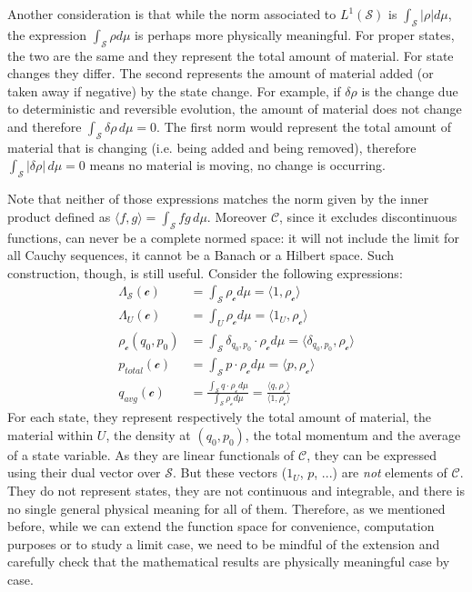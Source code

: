 \documentclass[aps,pra,10pt,twocolumn,floatfix,nofootinbib]{revtex4-1}
\numberwithin{equation}{section}
\theoremstyle{definition}
\begin{document}
Another consideration is that while the norm associated to $L^1(\mathcal{S})$ is $\int_{\mathcal{S}} |\rho| d\mu$, the expression $\int_{\mathcal{S}} \rho d\mu$ is perhaps more physically meaningful. For proper states, the two are the same and they represent the total amount of material. For state changes they differ. The second represents the amount of material added (or taken away if negative) by the state change. For example, if $\delta \rho$ is the change due to deterministic and reversible evolution, the amount of material does not change and therefore $\int_{\mathcal{S}} \delta \rho \, d\mu = 0$. The first norm would represent the total amount of material that is changing (i.e. being added and being removed), therefore $\int_{\mathcal{S}} | \delta \rho | \, d\mu = 0$ means no material is moving, no change is occurring.

Note that neither of those expressions matches the norm given by the inner product defined as $\langle f, g \rangle = \int_{\mathcal{S}} fg \, d\mu$. Moreover $\mathcal{C}$, since it excludes discontinuous functions, can never be a complete normed space: it will not include the limit for all Cauchy sequences, it cannot be a Banach or a Hilbert space. Such construction, though, is still useful. Consider the following expressions:
\begin{align*}
\Lambda_{\mathcal{S}} (\mathcal{c}) &= \int_\mathcal{S} \rho_{\mathcal{c}} d \mu = \langle 1 , \rho_{\mathcal{c}} \rangle \\
\Lambda_U (\mathcal{c}) &= \int_U \rho_{\mathcal{c}} d \mu = \langle 1_U , \rho_{\mathcal{c}} \rangle \\
\rho_\mathcal{c}(q_0,p_0) &= \int_\mathcal{S} \delta_{q_0,p_0} \cdot \rho_{\mathcal{c}} d \mu = \langle \delta_{q_0,p_0} , \rho_{\mathcal{c}} \rangle \\
p_{total}(\mathcal{c}) &= \int_\mathcal{S} p \cdot \rho_{\mathcal{c}} d \mu = \langle p , \rho_{\mathcal{c}} \rangle \\
q_{avg}(\mathcal{c}) &= \frac{\int_\mathcal{S} q \cdot \rho_{\mathcal{c}} d \mu}{\int_\mathcal{S} \rho_{\mathcal{c}} d \mu} = \frac{\langle q , \rho_{\mathcal{c}} \rangle}{\langle 1 , \rho_{\mathcal{c}} \rangle}
\end{align*}
For each state, they represent respectively the total amount of material, the material within $U$, the density at $(q_0, p_0)$, the total momentum and the average of a state variable. As they are linear functionals of $\mathcal{C}$,  they can be expressed using their dual vector over $\mathcal{S}$. But these vectors ($1_U$, $p$, ...) are \emph{not} elements of $\mathcal{C}$. They do not represent states, they are not continuous and integrable, and there is no single general physical meaning for all of them. Therefore, as we mentioned before, while we can extend the function space for convenience, computation purposes or to study a limit case, we need to be mindful of the extension and carefully check that the mathematical results are physically meaningful case by case.
\end{document}
